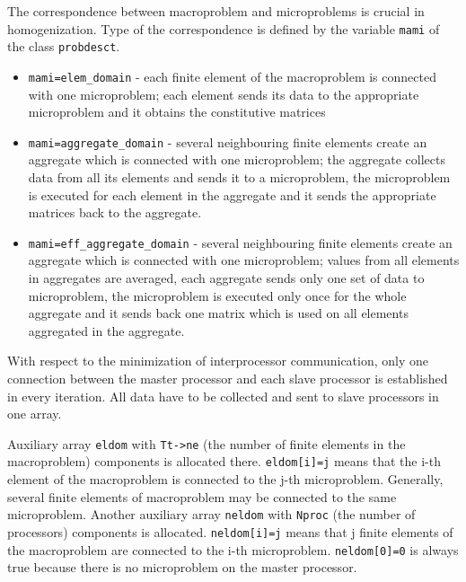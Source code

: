 The correspondence between macroproblem and microproblems is crucial
in homogenization. Type of the correspondence is defined by the
variable {\tt mami} of the class {\tt probdesct}.
\begin{itemize}
\item
{\tt mami=elem\_domain} - each finite element of the macroproblem
is connected with one microproblem; each element sends its data
to the appropriate microproblem and it obtains the constitutive matrices
\item
{\tt mami=aggregate\_domain} - 
several neighbouring finite elements create an aggregate which is
connected with one microproblem; the aggregate collects data from all
its elements and sends it to a microproblem, the microproblem
is executed for each element in the aggregate and it sends the appropriate
matrices back to the aggregate.
\item
{\tt mami=eff\_aggregate\_domain} - 
several neighbouring finite elements create an aggregate which is
connected with one microproblem; values from all elements in
aggregates are averaged, each aggregate sends only one set of data to
microproblem, the microproblem is executed only once for the whole aggregate
and it sends back one matrix which is used on all elements aggregated in the
aggregate.
\end{itemize}



With respect to the minimization of interprocessor communication,
only one connection between the master processor and each slave processor
is established in every iteration. All data have to be collected and
sent to slave processors in one array.


Auxiliary array {\tt eldom} with {\tt Tt->ne} (the number of finite
elements in the macroproblem) components is allocated
there. {\tt eldom[i]=j} means that the i-th element of the
macroproblem is connected to the j-th microproblem. Generally,
several finite elements of macroproblem may be connected to
the same microproblem. Another auxiliary array {\tt neldom}
with {\tt Nproc} (the number of processors) components is
allocated. {\tt neldom[i]=j} means that j finite elements of
the macroproblem are connected to the i-th microproblem.
{\tt neldom[0]=0} is always true because there is no microproblem
on the master processor.

